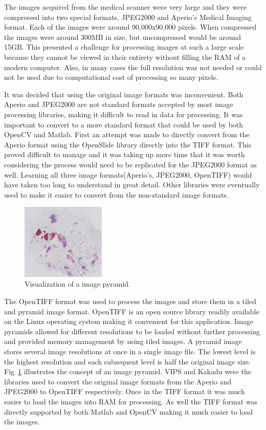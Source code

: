 \documentclass[a4paper,10pt,oneside]{article}
\begin{document}
The images acquired from the medical scanner were very large and they were compressed into two special formats, JPEG2000 and Aperio's Medical Imaging format. Each of the images were around 90,000x90,000 pixels. When compressed the images were around 300MB in size, but uncompressed would be around 15GB. This presented a challenge for processing images at such a large scale because they cannot be viewed in their entirety without filling the RAM of a modern computer. Also, in many cases the full resolution was not needed or could not be used due to computational cost of processing so many pixels.

It was decided that using the original image formats was inconvenient. Both Aperio and JPEG2000 are not standard formats accepted by most image processing libraries, making it difficult to read in data for processing. It was important to convert to a more standard format that could be used by both OpenCV and Matlab. First an attempt was made to directly convert from the Aperio format using the OpenSlide library directly into the TIFF format. This proved difficult to manage and it was taking up more time that it was worth considering the process would need to be replicated for the JPEG2000 format as well. Learning all three image formats(Aperio's, JPEG2000, OpenTIFF) would have taken too long to understand in great detail. Other libraries were eventually used to make it easier to convert from the non-standard image formats.

\begin{figure}[hbtp]
  \centering
  \includegraphics[width=4cm]{images/PO13-00516A1_1_7_201305171148.png}
  \caption{Visualization of a image pyramid.}
  \label{fig:imagepyramid}
\end{figure}

The OpenTIFF format was used to process the images and store them in a tiled and pyramid image format. OpenTIFF is an open source library readily available on the Linux operating system making it convenient for this application. Image pyramids allowed for different resolutions to be loaded without further processing and provided memory management by using tiled images. A pyramid image stores several image resolutions at once in a single image file. The lowest level is the highest resolution and each subsequent level is half the original image size. Fig~\ref{fig:imagepyramid} illustrates the concept of an image pyramid. VIPS and Kakadu were the libraries used to convert the original image formats from the Aperio and JPEG2000 to OpenTIFF respectively. Once in the TIFF format it was much easier to load the images into RAM for processing. As well the TIFF format was directly supported by both Matlab and OpenCV making it much easier to load the images.
\end{document}

